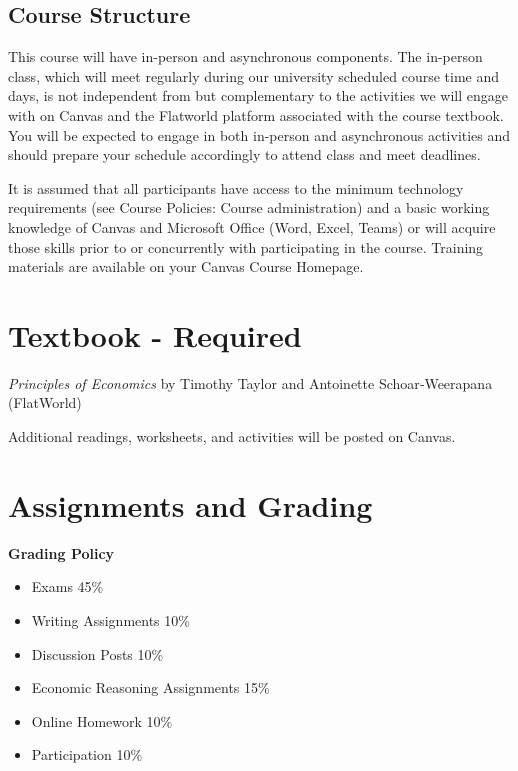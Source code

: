 \documentclass[
]{book}
\providecommand{\tightlist}{%
  \setlength{\itemsep}{0pt}\setlength{\parskip}{0pt}}
\begin{document}
\subsection*{Course Structure}\label{course-structure}

This course will have in-person and asynchronous components. The in-person class, which will meet regularly during our university scheduled course time and days, is not independent from but complementary to the activities we will engage with on Canvas and the Flatworld platform associated with the course textbook. You will be expected to engage in both in-person and asynchronous activities and should prepare your schedule accordingly to attend class and meet deadlines.

It is assumed that all participants have access to the minimum technology requirements (see Course Policies: Course administration) and a basic working knowledge of Canvas and Microsoft Office (Word, Excel, Teams) or will acquire those skills prior to or concurrently with participating in the course. Training materials are available on your Canvas Course Homepage.

\section*{Textbook - Required}\label{textbook---required}

\emph{Principles of Economics} by Timothy Taylor and Antoinette Schoar‑Weerapana (FlatWorld)

Additional readings, worksheets, and activities will be posted on Canvas.

\section*{Assignments and Grading}\label{assignments-and-grading}

\textbf{Grading Policy}

\begin{itemize}
\tightlist
\item
  Exams 45\%
\item
  Writing Assignments 10\%
\item
  Discussion Posts 10\%
\item
  Economic Reasoning Assignments 15\%
\item
  Online Homework 10\%
\item
  Participation 10\%
\end{itemize}
\end{document}
